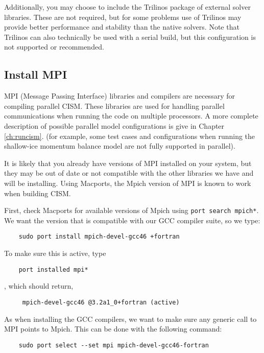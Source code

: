 Additionally, you may choose to include the Trilinos package of external solver libraries.  
These are not required, but for some problems use of Trilinos may provide better
performance and stability than the native solvers.  Note that Trilinos can also technically be 
used with a serial build, but this configuration is not supported or recommended.

\subsection{Install MPI}
MPI (Message Passing Interface) libraries and compilers are necessary for compiling parallel CISM.  
These libraries are used for handling parallel communications when running the 
code on multiple processors. A more complete description of possible parallel 
model configurations is give in Chapter \ref{ch:runcism}. 
(for example, some test cases and configurations when running the shallow-ice 
momentum balance model are not fully supported in parallel). 

\begin{mdframed}[style=mac] %
It is likely that you already have versions of MPI installed on your system, 
but they may be out of date or not compatible with the other libraries we have 
and will be installing. Using Macports, the Mpich version of MPI is known 
to work when building CISM.

First, check Macports for available versions of Mpich using \texttt{port search mpich*}. We want 
the version that is compatible with our GCC compiler suite, so we type: 

\begin{verbatim}
	sudo port install mpich-devel-gcc46 +fortran
\end{verbatim}

To make sure this is active, type 
\begin{verbatim}
	port installed mpi*
\end{verbatim}

, which should return, 

\begin{verbatim}
     mpich-devel-gcc46 @3.2a1_0+fortran (active)
\end{verbatim}

As when installing the GCC compilers, we want to make sure any generic call to MPI points to Mpich. This 
can be done with the following command:

\begin{verbatim}
	sudo port select --set mpi mpich-devel-gcc46-fortran
\end{verbatim}

\end{mdframed}              %



